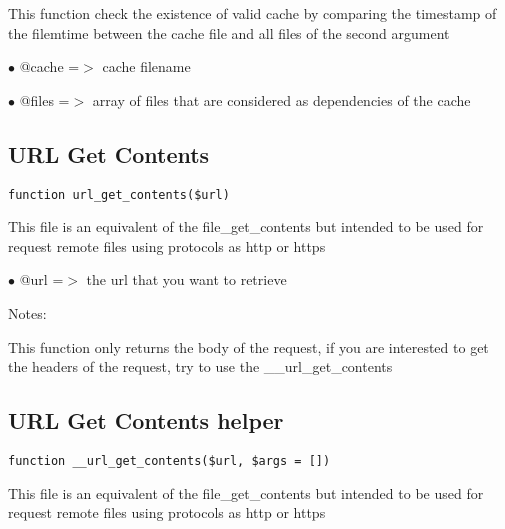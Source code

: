 \documentclass[a4paper]{book}
\begin{document}
This function check the existence of valid cache by comparing the timestamp
of the filemtime between the cache file and all files of the second argument

\begin{compactitem}
\item[\color{myblue}$\bullet$] @cache =$>$ cache filename
\item[\color{myblue}$\bullet$] @files =$>$ array of files that are considered as dependencies of the cache
\end{compactitem}

\hypertarget{toc132}{}
\subsection{URL Get Contents}

\begin{lstlisting}
function url_get_contents($url)
\end{lstlisting}

This file is an equivalent of the file\_get\_contents but intended to be used
for request remote files using protocols as http or https

\begin{compactitem}
\item[\color{myblue}$\bullet$] @url =$>$ the url that you want to retrieve
\end{compactitem}

Notes:

This function only returns the body of the request, if you are interested
to get the headers of the request, try to use the \_\_url\_get\_contents

\hypertarget{toc133}{}
\subsection{URL Get Contents helper}

\begin{lstlisting}
function __url_get_contents($url, $args = [])
\end{lstlisting}

This file is an equivalent of the file\_get\_contents but intended to be used
for request remote files using protocols as http or https
\end{document}
